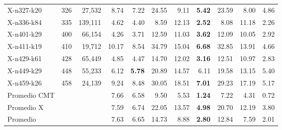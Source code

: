 \begin{tabular}{lrrrrrrrrrr}
X-n327-k20 & 326 & 27,532 & 8.74 & 7.22 & 24.55 & 9.11 & \textbf{5.42} & 23.59 & 8.00 & 4.86 \\
X-n336-k84 & 335 & 139,111 & 4.62 & 4.40 & 8.59 & 12.13 & \textbf{2.52} & 8.08 & 11.18 & 2.26 \\
X-n401-k29 & 400 & 66,154 & 4.26 & 3.71 & 12.59 & 11.03 & \textbf{3.62} & 12.09 & 10.05 & 2.92 \\
X-n411-k19 & 410 & 19,712 & 10.17 & 8.54 & 34.79 & 15.04 & \textbf{6.68} & 32.85 & 13.91 & 4.66 \\
X-n429-k61 & 428 & 65,449 & 4.85 & 4.47 & 14.70 & 12.02 & \textbf{3.16} & 12.51 & 10.97 & 2.83 \\
X-n449-k29 & 448 & 55,233 & 6.12 & \textbf{5.78} & 20.89 & 14.57 & 6.11 & 19.58 & 13.15 & 5.40 \\
X-n459-k26 & 458 & 24,139 & 9.24 & 8.48 & 30.05 & 18.51 & \textbf{7.01} & 29.23 & 17.19 & 5.17 \\
\midrule
Promedio CMT &  &  & 7.66 & 6.58 & 9.50 & 5.53 & \textbf{1.24} & 7.22 & 4.31 & 0.72 \\
Promedio X &  &  & 7.59 & 6.74 & 22.05 & 13.57 & \textbf{4.98} & 20.70 & 12.19 & 3.80 \\
Promedio &  &  & 7.63 & 6.65 & 14.73 & 8.88 & \textbf{2.80} & 12.84 & 7.59 & 2.01 \\
\bottomrule
\end{tabular}
